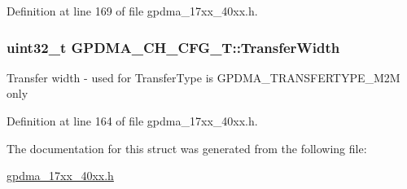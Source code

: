 Definition at line 169 of file gpdma\+\_\+17xx\+\_\+40xx.\+h.

\subsubsection[{\texorpdfstring{Transfer\+Width}{TransferWidth}}]{\setlength{\rightskip}{0pt plus 5cm}uint32\+\_\+t G\+P\+D\+M\+A\+\_\+\+C\+H\+\_\+\+C\+F\+G\+\_\+\+T\+::\+Transfer\+Width}\hypertarget{structGPDMA__CH__CFG__T_a7aff974420b56393365cc335015ba8df}{}\label{structGPDMA__CH__CFG__T_a7aff974420b56393365cc335015ba8df}
Transfer width -\/ used for Transfer\+Type is G\+P\+D\+M\+A\+\_\+\+T\+R\+A\+N\+S\+F\+E\+R\+T\+Y\+P\+E\+\_\+\+M2M only 

Definition at line 164 of file gpdma\+\_\+17xx\+\_\+40xx.\+h.



The documentation for this struct was generated from the following file\+:\begin{DoxyCompactItemize}
\item 
\hyperlink{gpdma__17xx__40xx_8h}{gpdma\+\_\+17xx\+\_\+40xx.\+h}\end{DoxyCompactItemize}
